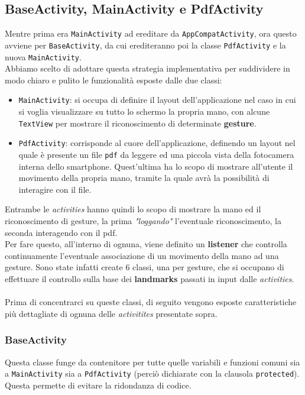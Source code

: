 \subsection{BaseActivity, MainActivity e PdfActivity}
Mentre prima era \texttt{MainActivity} ad ereditare da \texttt{AppCompatActivity}, ora questo avviene per \texttt{BaseActivity}, da cui erediteranno poi la classe \texttt{PdfActivity} e la nuova \texttt{MainActivity}.\\
Abbiamo scelto di adottare questa strategia implementativa per suddividere in modo chiaro e pulito le funzionalità esposte dalle due classi:
\begin{itemize}
    \item \texttt{MainActivity}: si occupa di definire il layout dell'applicazione nel caso in cui si voglia visualizzare su tutto lo schermo la propria mano, con alcune \texttt{TextView} per mostrare il riconoscimento di determinate \textbf{gesture}.
    \item \texttt{PdfActivity}: corrisponde al cuore dell'applicazione, definendo un layout nel quale è presente un file \texttt{pdf} da leggere ed una piccola vista della fotocamera interna dello smartphone. Quest'ultima ha lo scopo di mostrare all'utente il movimento della propria mano, tramite la quale avrà la possibilità di interagire con il file.
\end{itemize}
\noindent Entrambe le \textit{activities} hanno quindi lo scopo di mostrare la mano ed il riconoscimento di gesture, la prima \textit{"loggando"} l'eventuale riconoscimento, la seconda interagendo con il pdf.\\
Per fare questo, all'interno di ognuna, viene definito un \textbf{listener} che controlla continuamente l'eventuale associazione di un movimento della mano ad una gesture. Sono state infatti create 6 classi, una per gesture, che si occupano di effettuare il controllo sulla base dei \textbf{landmarks} passati in input dalle \textit{activities}.\\
\\
Prima di concentrarci su queste classi, di seguito vengono esposte caratteristiche più dettagliate di ognuna delle \textit{activitites} presentate sopra.

\subsubsection{BaseActivity}
Questa classe funge da contenitore per tutte quelle variabili e funzioni comuni sia a \texttt{MainActivity} sia a \texttt{PdfActivity} (perciò dichiarate con la clausola \texttt{protected}). Questa permette di evitare la ridondanza di codice.\\

